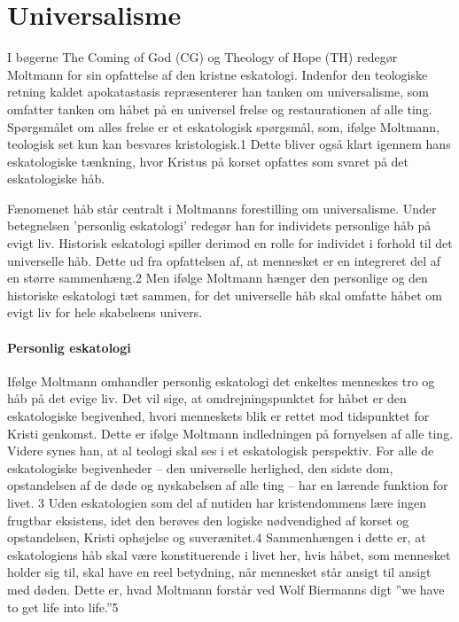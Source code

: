 \chapter{Universalisme}
I bøgerne The Coming of God (CG) og Theology of Hope (TH) redegør Moltmann for sin opfattelse af den kristne eskatologi. Indenfor den teologiske retning kaldet apokatastasis repræsenterer han tanken om universalisme, som omfatter tanken om håbet på en universel frelse og restaurationen af alle ting. Spørgsmålet om alles frelse er et eskatologisk spørgsmål, som, ifølge Moltmann, teologisk set kun kan besvares kristologisk.1 Dette bliver også klart igennem hans eskatologiske tænkning, hvor Kristus på korset opfattes som svaret på det eskatologiske håb.

Fænomenet håb står centralt i Moltmanns forestilling om universalisme. Under betegnelsen 'personlig eskatologi' redegør han for individets personlige håb på evigt liv. Historisk eskatologi spiller derimod en rolle for individet i forhold til det universelle håb. Dette ud fra opfattelsen af, at mennesket er en integreret del af en større sammenhæng.2 Men ifølge Moltmann hænger den personlige og den historiske eskatologi tæt sammen, for det universelle håb skal omfatte håbet om evigt liv for hele skabelsens univers.  

\subsubsection{Personlig eskatologi}
Ifølge Moltmann omhandler personlig eskatologi det enkeltes menneskes tro og håb på det evige liv. Det
vil sige, at omdrejningspunktet for håbet er den eskatologiske begivenhed, hvori menneskets blik er rettet mod tidspunktet for Kristi genkomst. Dette er ifølge Moltmann indledningen på fornyelsen af alle ting. Videre synes han, at al teologi skal ses i et eskatologisk perspektiv. For alle de eskatologiske begivenheder -- den universelle herlighed, den sidste dom, opstandelsen af de døde og nyskabelsen af alle ting -- har en lærende funktion for livet. 3 Uden eskatologien som del af nutiden har kristendommens lære ingen frugtbar eksistens, idet den berøves den logiske nødvendighed af korset og opstandelsen, Kristi ophøjelse og suverænitet.4 Sammenhængen i dette er, at eskatologiens håb skal være konstituerende i livet her, hvis håbet, som mennesket holder sig til, skal have en reel betydning, når mennesket står ansigt til ansigt med døden. Dette er, hvad Moltmann forstår ved Wolf Biermanns digt ”we have to get life into life.”5

